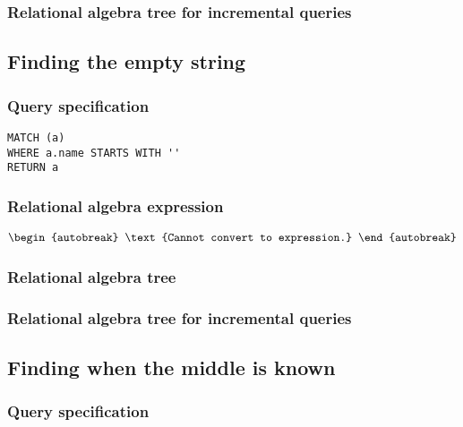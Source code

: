 \subsubsection*{Relational algebra tree for incremental queries}


\subsection{Finding the empty string}

\subsubsection*{Query specification}

\begin{lstlisting}
MATCH (a)
WHERE a.name STARTS WITH ''
RETURN a
\end{lstlisting}

\subsubsection*{Relational algebra expression}

\begin{align*}
\begin{autobreak}
\text{Cannot convert to expression.}
\end{autobreak}
\end{align*}

\subsubsection*{Relational algebra tree}


\subsubsection*{Relational algebra tree for incremental queries}


\subsection{Finding when the middle is known}

\subsubsection*{Query specification}

